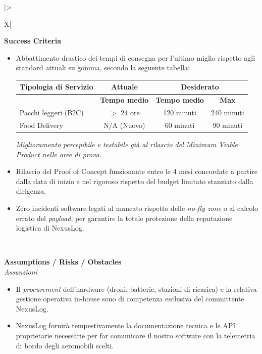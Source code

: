 \documentclass[12pt, a4paper]{article}
\begin{document}
\begin{xltabular}{\textwidth}{|>{\raggedright\arraybackslash}X|}
    \textbf{Success Criteria} \\
    \hline
    \begin{itemize}[leftmargin=*, topsep=0pt]
        \item Abbattimento drastico dei tempi di consegna per l'ultimo miglio rispetto agli standard attuali su gomma, secondo la seguente tabella:
        \vspace{0.5em}
        
        \begin{center}
        \renewcommand{\arraystretch}{1.2}
        \begin{tabularx}{\linewidth}{|>{\raggedright\arraybackslash}X|c|c|c|}
            \hline
            \rowcolor{headerblue!20}
            \textbf{Tipologia di Servizio} & \textbf{Attuale} & \multicolumn{2}{c|}{\textbf{Desiderato}} \\
            \cline{2-4}
            \rowcolor{headerblue!10}
            & \textbf{Tempo medio} & \textbf{Tempo medio}  & \textbf{Max} \\
            \hline
            Pacchi leggeri (B2C) & $>$ 24 ore & 120 minuti  & 240 minuti \\
            \hline
            Food Delivery & N/A (Nuovo) & 60 minuti  & 90 minuti \\
            \hline
        \end{tabularx}
        \end{center}
        
        \vspace{0.5em}
        \textit{Miglioramento percepibile e testabile già al rilascio del Minimum Viable Product nelle aree di prova.}
        
        \item Rilascio del Proof of Concept funzionante entro le 4 mesi concordate a partire dalla data di inizio e nel rigoroso rispetto del budget limitato stanziato dalla dirigenza.
        
        \item Zero incidenti software legati al mancato rispetto delle \textit{no-fly zone} o al calcolo errato del \textit{payload}, per garantire la totale protezione della reputazione logistica di NexusLog.
    \end{itemize} \\
    \hline

    \textbf{Assumptions / Risks / Obstacles} \\
    \hline
    \textit{Assunzioni}
    \begin{itemize}[leftmargin=*, noitemsep, topsep=0pt]
        \item Il \textit{procurement} dell'hardware (droni, batterie, stazioni di ricarica) e la relativa gestione operativa in-house sono di competenza esclusiva del committente NexusLog.
        \item NexusLog fornirà tempestivamente la documentazione tecnica e le API proprietarie necessarie per far comunicare il nostro software con la telemetria di bordo degli aeromobili scelti.
    \end{itemize}
    

\end{xltabular}
\end{document}
